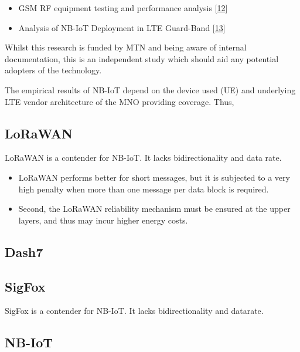 \documentclass[]{article}
\providecommand{\tightlist}{%
  \setlength{\itemsep}{0pt}\setlength{\parskip}{0pt}}
\begin{document}
\begin{itemize}
\tightlist
\item
  GSM RF equipment testing and performance analysis
  {[}\protect\hyperlink{ref-Kasbah2005}{12}{]}
\item
  Analysis of NB-IoT Deployment in LTE Guard-Band
  {[}\protect\hyperlink{ref-Ratasuk2017c}{13}{]}
\end{itemize}

Whilst this research is funded by MTN and being aware of internal
documentation, this is an independent study which should aid any
potential adopters of the technology.

The empirical results of NB-IoT depend on the device used (UE) and
underlying LTE vendor architecture of the MNO providing coverage. Thus,

\hypertarget{lorawan}{%
\subsection{LoRaWAN}\label{lorawan}}

LoRaWAN is a contender for NB-IoT. It lacks bidirectionality and data
rate.

\begin{itemize}
\tightlist
\item
  LoRaWAN performs better for short messages, but it is subjected to a
  very high penalty when more than one message per data block is
  required.
\item
  Second, the LoRaWAN reliability mechanism must be ensured at the upper
  layers, and thus may incur higher energy costs.
\end{itemize}

\hypertarget{dash7}{%
\subsection{Dash7}\label{dash7}}

\hypertarget{sigfox}{%
\subsection{SigFox}\label{sigfox}}

SigFox is a contender for NB-IoT. It lacks bidirectionality and
datarate.

\hypertarget{nbiot_lit}{%
\subsection{NB-IoT}\label{nbiot_lit}}
\end{document}
